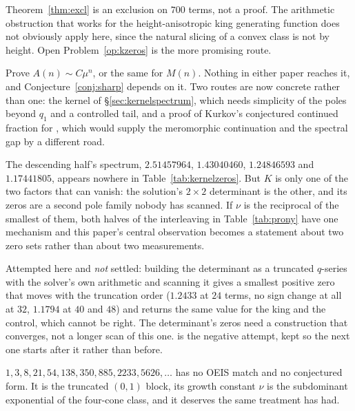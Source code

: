 \documentclass[11pt]{article}
\begin{document}
\begin{openproblem}
Theorem~\ref{thm:excl} is an exclusion on $700$ terms, not a proof. The
arithmetic obstruction that works for the height-anisotropic king generating
function does not obviously apply here, since the natural slicing of a convex
class is not by height. Open Problem~\ref{op:kzeros} is the more promising
route.
\end{openproblem}

\begin{openproblem}
Prove $A(n) \sim C\mu^n$, or the same for $M(n)$. Nothing in either paper
reaches it, and Conjecture~\ref{conj:sharp} depends on it. Two routes are now
concrete rather than one: the kernel of \S\ref{sec:kernelspectrum}, which needs
simplicity of the poles beyond $q_1$ and a controlled tail, and a proof of
Kurkov's conjectured continued fraction for , which would supply
the meromorphic continuation and the spectral gap by a different road.
\end{openproblem}

\begin{openproblem}
\label{op:det}
The descending half's spectrum, $2.51457964$, $1.43040460$, $1.24846593$ and
$1.17441805$, appears nowhere in Table~\ref{tab:kernelzeros}. But $K$ is only
one of the two factors that can vanish: the solution's $2\times2$ determinant is
the other, and its zeros are a second pole family nobody has scanned. If $\nu$
is the reciprocal of the smallest of them, both halves of the interleaving in
Table~\ref{tab:prony} have one mechanism and this paper's central observation
becomes a statement about two zero sets rather than about two measurements.

Attempted here and \emph{not} settled: building the determinant as a truncated
$q$-series with the solver's own arithmetic and scanning it gives a smallest
positive zero that moves with the truncation order ($1.2433$ at $24$ terms,
no sign change at all at $32$, $1.1794$ at $40$ and $48$) and returns the
same value for the king and the control, which cannot be right. The
determinant's zeros need a construction that converges, not a longer scan of
this one.  is the negative attempt,
kept so the next one starts after it rather than before.
\end{openproblem}

\begin{openproblem}
$1, 3, 8, 21, 54, 138, 350, 885, 2233, 5626, \dots$ has no OEIS match and no
conjectured form. It is the truncated $(0,1)$ block, its growth constant $\nu$
is the subdominant exponential of the four-cone class, and it deserves the same
treatment  has had.
\end{openproblem}
\end{document}
